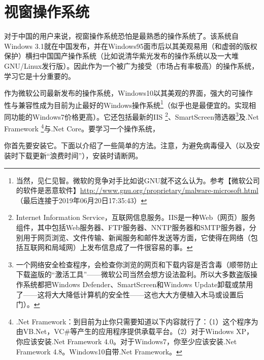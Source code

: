 \section{视窗操作系统}
对于中国的用户来说，视窗操作系统恐怕是最熟悉的操作系统了。该系统自Windows 3.1就在中国发布，并在Windows95面市后以其美观易用（和虚弱的版权保护）横扫中国国产操作系统（比如说清华紫光发布的操作系统以及一大堆GNU/Linux发行版）。因此作为一个被广为接受（市场占有率极高）的操作系统，学习它是十分重要的。\par
作为微软公司最新发布的操作系统，Windows10以其美观的界面，强大的可操作性与兼容性成为目前为止最好的Windows操作系统\footnote{当然，见仁见智。微软的竞争对手比如说GNU就不这么认为。参考【微软公司的软件是恶意软件】\url{http://www.gnu.org/proprietary/malware-microsoft.html}（最后连接于2019年06月20日17:35:43）}（似乎也是最便宜的。实现相同功能的Windows7价格更高）。它还包括最新的IIS \footnote{Internet Information Service，互联网信息服务。IIS是一种Web（网页）服务组件，其中包括Web服务器、FTP服务器、NNTP服务器和SMTP服务器，分别用于网页浏览、文件传输、新闻服务和邮件发送等方面，它使得在网络（包括互联网和局域网）上发布信息成了一件很容易的事。\cite{iisinfo}}、SmartScreen筛选器\footnote{一个网络安全检查程序，会检查你浏览的网页和下载内容是否含毒（顺带防止下载盗版的“激活工具”——微软公司当然会想方设法盈利。所以大多数盗版操作系统都把Windows Defender、SmartScreen和Windows Update卸载或禁用了——这将大大降低计算机的安全性——这也大大方便植入木马或设置后门）。}及.Net Framework \footnote{.Net Framework：到目前为止你只需要知道以下内容就行了：（1）这个程序为由VB.Net，VC\#等产生的应用程序提供承载平台。（2）对于Windows XP，你应该安装.Net Framework 4.0。对于Windows7，你至少应该安装.Net Framework 4.8。Windows10自带.Net Framework。}与.Net Core。要学习一个操作系统，\par 
你首先要安装它。下面以介绍了一些简单的方法。注意，为避免病毒侵入（以及安装时下载更新“浪费时间”），安装时请断网。\par
